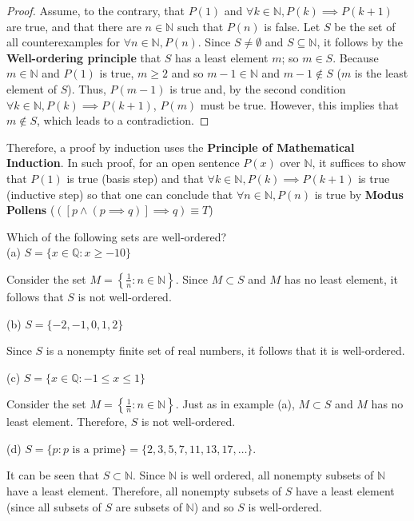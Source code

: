 \documentclass[12pt]{article}
\newcommand{\N}{\mathbb{N}}
\newcommand{\Q}{\mathbb{Q}}
\newenvironment{problem}[2][Problem]{\begin{trivlist}
		\item[\hskip \labelsep {\bfseries #1}\hskip \labelsep {\bfseries #2.}]}{\end{trivlist}}
\newenvironment{solution}[2][Solution]{\begin{trivlist}
		\item[\hskip \labelsep {\bfseries #1}\hskip \labelsep {\bfseries #2.}]}{\end{trivlist}}
\begin{document}
	\begin{proof}
		Assume, to the contrary, that $P(1)$ and $\forall k\in \N, P(k)\implies P(k+1)$ are true, and that there are $n\in \N$ such that $P(n)$ is false. Let $S$ be the set of all counterexamples for $\forall n \in \N, P(n)$. Since $S\neq \emptyset$ and $S\subseteq \N$, it follows by the \textbf{Well-ordering principle} that $S$ has a least element $m$; so $m\in S$. Because $m\in \N$ and $P(1)$ is true, $m\geq 2$ and so $m-1\in \N$ and $m-1\not\in S$ ($m$ is the least element of $S$). Thus, $P(m-1)$ is true and, by the second condition $\forall k\in \N, P(k)\implies P(k+1)$, $P(m)$ must be true. However, this implies that $m\not\in S$, which leads to a contradiction.
	\end{proof}

	Therefore, a proof by induction uses the \textbf{Principle of Mathematical Induction}. In such proof, for an open sentence  $P(x)$ over $\N$, it suffices to show that $P(1)$ is true (basis step) and that $\forall k\in \N, P(k)\implies P(k+1)$ is true (inductive step) so that one can conclude that $\forall n\in \N, P(n)$ is true by \textbf{Modus Pollens} ($([p\land (p\implies q)]\implies q) \equiv T$)
	
	\begin{problem}{1}
		Which of the following sets are well-ordered?\\
		
		(a) $S = \{x\in \Q: x\geq -10\}$
		\begin{solution}{a}
			Consider the set $M = \left\{\frac{1}{n}: n\in \N\right\}$. Since $M\subset S$ and $M$ has no least element, it follows that $S$ is not well-ordered.
		\end{solution} 
	
		(b) $S=\{-2,-1,0,1,2\}$
		\begin{solution}{b}
			Since $S$ is a nonempty finite set of real numbers, it follows that it is well-ordered.
		\end{solution} 
	
		(c) $S=\{x\in \Q: -1\leq x \leq 1\}$
		\begin{solution}{c}
			Consider the set $M = \left\{\frac{1}{n}: n\in \N\right\}$. Just as in example (a), $M\subset S$ and $M$ has no least element. Therefore, $S$ is not well-ordered.
		\end{solution}
	
		(d) $S=\{p:p \text{ is a prime}\} = \{2,3,5,7,11,13,17,\ldots \}$.
		\begin{solution}{d}
			It can be seen that $S\subset \N$. Since $\N$ is well ordered, all nonempty subsets of $\N$ have a least element. Therefore, all nonempty subsets of $S$ have a least element (since all subsets of $S$ are subsets of $\N$) and so $S$ is well-ordered.
		\end{solution}
	\end{problem}
\end{document}
